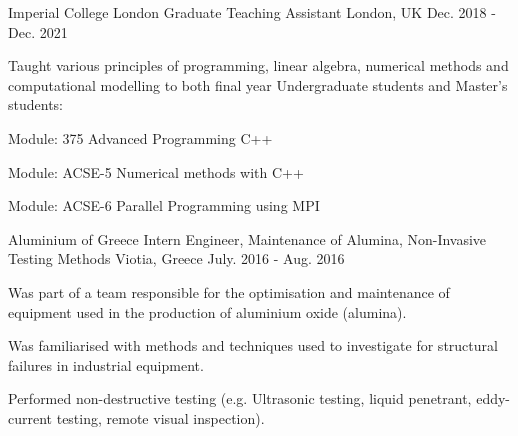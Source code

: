 \begin{cventries}
  \cventry
    {Imperial College London}
    {Graduate Teaching Assistant}
    {London, UK}
    {Dec. 2018 - Dec. 2021}
    {
      Taught various principles of programming, linear algebra, 
      numerical methods and computational modelling to both final year Undergraduate
      students and Master's students:\hfill \break%
      \begin{cvitems}
        \item {Module: 375 Advanced Programming C++}
        \item {Module: ACSE-5 Numerical methods with C++}
        \item {Module: ACSE-6 Parallel Programming using MPI}
      \end{cvitems} 
    }

  \cventry
    {Aluminium of Greece}
    {Intern Engineer, Maintenance of Alumina, Non-Invasive Testing Methods}    
    {Viotia, Greece}
    {July. 2016 - Aug. 2016}
    {
      \begin{cvitems}
       \item {Was part of a team responsible for the optimisation and maintenance of equipment used in the production of aluminium oxide (alumina).}
       \item {Was familiarised with methods and techniques used to investigate for structural failures in industrial equipment.}
       \item {Performed non-destructive testing (e.g. Ultrasonic testing, liquid penetrant, eddy-current testing, remote visual inspection).}
      \end{cvitems}
    }

\end{cventries}
